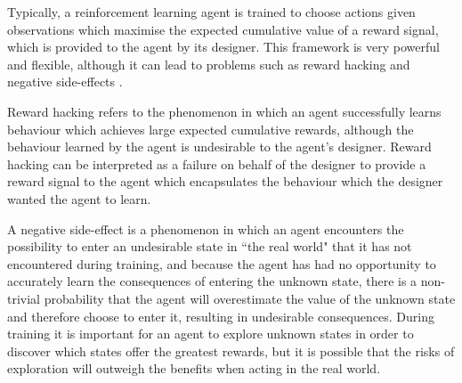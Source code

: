 Typically, a reinforcement learning agent is trained to choose actions given observations which maximise the expected cumulative value of a reward signal, which is provided to the agent by its designer. This framework is very powerful and flexible, although it can lead to problems such as reward hacking and negative side-effects \cite{hadfield2017inverse}.

Reward hacking refers to the phenomenon in which an agent successfully learns behaviour which achieves large expected cumulative rewards, although the behaviour learned by the agent is undesirable to the agent's designer. Reward hacking can be interpreted as a failure on behalf of the designer to provide a reward signal to the agent which encapsulates the behaviour which the designer wanted the agent to learn.

A negative side-effect is a phenomenon in which an agent encounters the possibility to enter an undesirable state in ``the real world" that it has not encountered during training, and because the agent has had no opportunity to accurately learn the consequences of entering the unknown state, there is a non-trivial probability that the agent will overestimate the value of the unknown state and therefore choose to enter it, resulting in undesirable consequences. During training it is important for an agent to explore unknown states in order to discover which states offer the greatest rewards, but it is possible that the risks of exploration will outweigh the benefits when acting in the real world.

